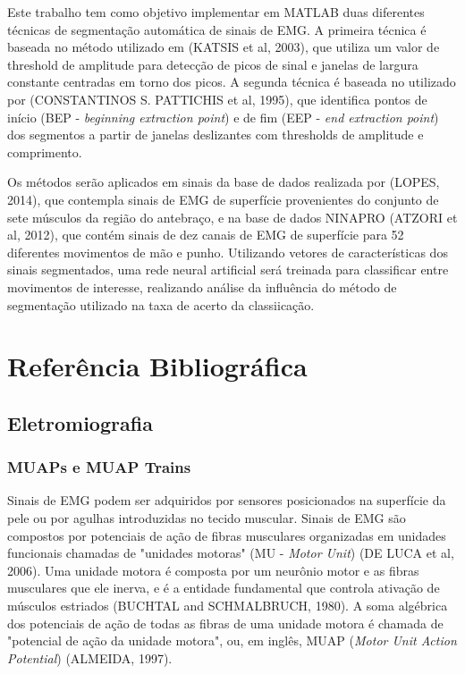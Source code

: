 \documentclass[
	12pt,				%
	openright,			%
	oneside,
	a4paper,			%
	english,			%
	francais,				%
	spanish,			%
	brazil				%
	]{abntex2}
\begin{document}
	Este trabalho tem como objetivo implementar em MATLAB duas diferentes técnicas de segmentação automática de sinais de EMG. A primeira técnica é baseada no método utilizado em (KATSIS et al, 2003), que utiliza um valor de threshold de amplitude para detecção de picos de sinal e janelas de largura constante centradas em torno dos picos. A segunda técnica é baseada no utilizado por (CONSTANTINOS S. PATTICHIS et al, 1995), que identifica pontos de início (BEP - \emph{beginning extraction point}) e de fim (EEP - \emph{end extraction point}) dos segmentos a partir de janelas deslizantes com thresholds de amplitude e comprimento.

	Os métodos serão aplicados em sinais da base de dados realizada por (LOPES, 2014), que contempla sinais de EMG de superfície provenientes do conjunto de sete músculos da região do antebraço, e na base de dados NINAPRO (ATZORI et al, 2012), que contém sinais de dez canais de EMG de superfície para 52 diferentes movimentos de mão e punho. Utilizando vetores de características dos sinais segmentados, uma rede neural artificial será treinada para classificar entre movimentos de interesse, realizando análise da influência do método de segmentação utilizado na taxa de acerto da classiicação.
	
\chapter{Referência Bibliográfica}

\section{Eletromiografia}

\subsection{MUAPs e MUAP Trains}

	Sinais de EMG podem ser adquiridos por sensores posicionados na superfície da pele ou por agulhas introduzidas no tecido muscular. Sinais de EMG são compostos por potenciais de ação de fibras musculares organizadas em unidades funcionais chamadas de "unidades motoras" (MU - \emph{Motor Unit}) (DE LUCA et al, 2006). Uma unidade motora é composta por um neurônio motor e as fibras musculares que ele inerva, e é a entidade fundamental que controla ativação de músculos estriados (BUCHTAL and SCHMALBRUCH, 1980). A soma algébrica dos potenciais de ação de todas as fibras de uma unidade motora é chamada de "potencial de ação da unidade motora", ou, em inglês, MUAP (\emph{Motor Unit Action Potential}) (ALMEIDA, 1997).
\end{document}
